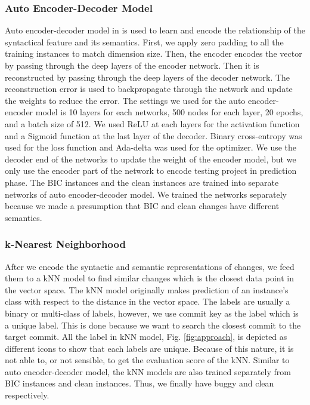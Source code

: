     \subsubsection{Auto Encoder-Decoder Model}
    Auto encoder-decoder model in {\simfin} is used to learn and encode the relationship of the syntactical feature and its semantics.
    First, we apply zero padding to all the training instances to match dimension size.
    Then, the encoder encodes the vector by passing through the deep layers of the encoder network.
    Then it is reconstructed by passing through the deep layers of the decoder network.
    The reconstruction error is used to backpropagate through the network and update the weights to reduce the error.
    The settings we used for the auto encoder-encoder model is 10 layers for each networks, 500 nodes for each layer, 20 epochs, and a batch size of 512.
    We used ReLU at each layers for the activation function and a Sigmoid function at the last layer of the decoder.
    Binary cross-entropy was used for the loss function and Ada-delta was used for the optimizer.
    We use the decoder end of the networks to update the weight of the encoder model, but we only use the encoder part of the network to encode testing project in prediction phase.
    The BIC instances and the clean instances are trained into separate networks of auto encoder-decoder model.
    We trained the networks separately because we made a presumption that BIC and clean changes have different semantics.
    
    \subsubsection{k-Nearest Neighborhood}
    After we encode the syntactic and semantic representations of changes, we feed them to a kNN model to find similar changes which is the closest data point in the vector space.
    The kNN model originally makes prediction of an instance's class with respect to the distance in the vector space.
    The labels are usually a binary or multi-class of labels, however, we use commit key as the label which is a unique label.
    This is done because we want to search the closest commit to the target commit.
    All the label in kNN model, Fig. \ref{fig:approach}, is depicted as different icons to show that each labels are unique.
    Because of this nature, it is not able to, or not sensible, to get the evaluation score of the kNN.
    Similar to auto encoder-decoder model, the kNN models are also trained separately from BIC instances and clean instances.
    Thus, we finally have buggy {\simfin} and clean {\simfin} respectively.
    

